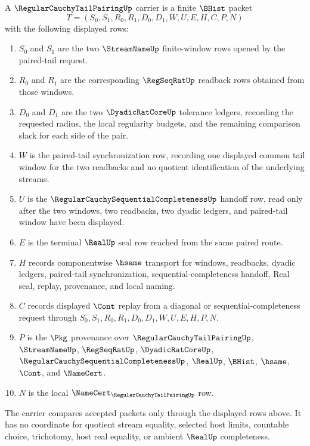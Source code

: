 \begin{definition}
\label{def:regular-cauchy-tail-pairing-carrier}
A $\RegularCauchyTailPairingUp$ carrier is a finite $\BHist$ packet
$$
T=(S_0,S_1,R_0,R_1,D_0,D_1,W,U,E,H,C,P,N)
$$
with the following displayed rows:
\begin{enumerate}
\item $S_0$ and $S_1$ are the two $\StreamNameUp$ finite-window rows opened by the paired-tail request.
\item $R_0$ and $R_1$ are the corresponding $\RegSeqRatUp$ readback rows obtained from those windows.
\item $D_0$ and $D_1$ are the two $\DyadicRatCoreUp$ tolerance ledgers, recording the requested radius, the local regularity budgets, and the remaining comparison slack for each side of the pair.
\item $W$ is the paired-tail synchronization row, recording one displayed common tail window for the two readbacks and no quotient identification of the underlying streams.
\item $U$ is the $\RegularCauchySequentialCompletenessUp$ handoff row, read only after the two windows, two readbacks, two dyadic ledgers, and paired-tail window have been displayed.
\item $E$ is the terminal $\RealUp$ seal row reached from the same paired route.
\item $H$ records componentwise $\hsame$ transport for windows, readbacks, dyadic ledgers, paired-tail synchronization, sequential-completeness handoff, Real seal, replay, provenance, and local naming.
\item $C$ records displayed $\Cont$ replay from a diagonal or sequential-completeness request through $S_0,S_1,R_0,R_1,D_0,D_1,W,U,E,H,P,N$.
\item $P$ is the $\Pkg$ provenance over $\RegularCauchyTailPairingUp$, $\StreamNameUp$, $\RegSeqRatUp$, $\DyadicRatCoreUp$, $\RegularCauchySequentialCompletenessUp$, $\RealUp$, $\BHist$, $\hsame$, $\Cont$, and $\NameCert$.
\item $N$ is the local $\NameCert_{\RegularCauchyTailPairingUp}$ row.
\end{enumerate}
The carrier compares accepted packets only through the displayed rows above. It has no coordinate for quotient stream equality, selected host limits, countable choice, trichotomy, host real equality, or ambient $\RealUp$ completeness.
\end{definition}

